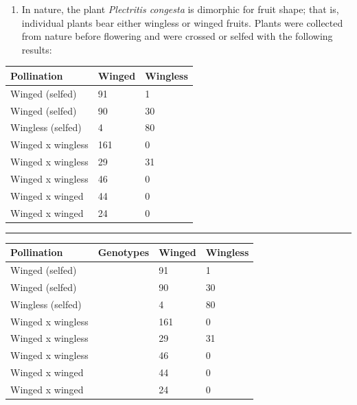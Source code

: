 \documentclass[11pt,]{article}
\providecommand{\tightlist}{%
  \setlength{\itemsep}{0pt}\setlength{\parskip}{0pt}}
\begin{document}
\begin{blackbox}

\begin{enumerate}
\def\labelenumi{\arabic{enumi}.}
\setcounter{enumi}{48}
\tightlist
\item
  In nature, the plant \emph{Plectritis congesta} is dimorphic for fruit
  shape; that is, individual plants bear either wingless or winged
  fruits. Plants were collected from nature before flowering and were
  crossed or selfed with the following results:
\end{enumerate}

\hfill\break

\begin{longtable}[]{@{}lll@{}}
\toprule
Pollination & Winged & Wingless\tabularnewline
\midrule
\endhead
Winged (selfed) & 91 & 1\tabularnewline
Winged (selfed) & 90 & 30\tabularnewline
Wingless (selfed) & 4 & 80\tabularnewline
Winged x wingless & 161 & 0\tabularnewline
Winged x wingless & 29 & 31\tabularnewline
Winged x wingless & 46 & 0\tabularnewline
Winged x winged & 44 & 0\tabularnewline
Winged x winged & 24 & 0\tabularnewline
\bottomrule
\end{longtable}

\begin{center}\rule{0.5\linewidth}{0.5pt}\end{center}

\hfill\break

\begin{longtable}[]{@{}llll@{}}
\toprule
Pollination & Genotypes & Winged & Wingless\tabularnewline
\midrule
\endhead
Winged (selfed) & & 91 & 1\tabularnewline
Winged (selfed) & & 90 & 30\tabularnewline
Wingless (selfed) & & 4 & 80\tabularnewline
Winged x wingless & & 161 & 0\tabularnewline
Winged x wingless & & 29 & 31\tabularnewline
Winged x wingless & & 46 & 0\tabularnewline
Winged x winged & & 44 & 0\tabularnewline
Winged x winged & & 24 & 0\tabularnewline
\bottomrule
\end{longtable}

\vspace{7cm}

\end{blackbox}
\end{document}
